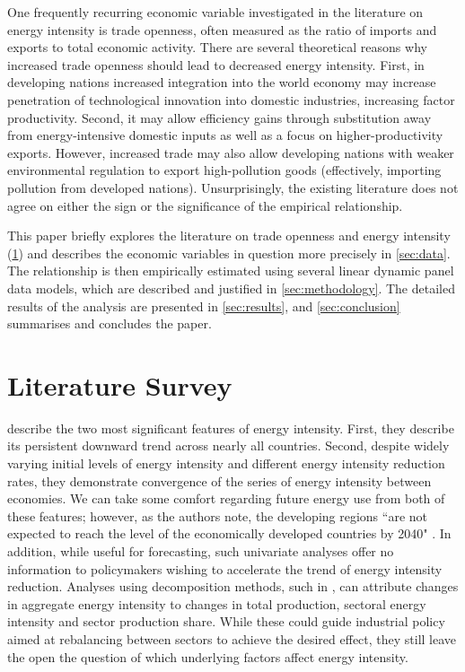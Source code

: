 \documentclass[12pt,a4paper]{article}
\begin{document}
One frequently recurring economic variable investigated in the literature on energy intensity is trade openness, often measured as the ratio of imports and exports to total economic activity.
There are several theoretical reasons why increased trade openness should lead to decreased energy intensity.
First, in developing nations increased integration into the world economy may increase penetration of technological innovation into domestic industries, increasing factor productivity.
Second, it may allow efficiency gains through substitution away from energy-intensive domestic
inputs as well as a focus on higher-productivity exports. 
However, increased trade may also allow developing nations with weaker environmental regulation to export high-pollution goods (effectively, importing pollution from developed nations). 
Unsurprisingly, the existing literature does not agree on either the sign or the significance of the empirical relationship.

This paper briefly explores the literature on trade openness and energy intensity (\cref{sec:literature}) and describes the economic variables in question more precisely in \cref{sec:data}.
The relationship is then empirically estimated using several linear dynamic panel data models, which are described and justified in \cref{sec:methodology}.
The detailed results of the analysis are presented in \cref{sec:results}, and \cref{sec:conclusion} summarises and concludes the paper.

\section{Literature Survey}\label{sec:literature}

\cite{ederAnalysisEnergyIntensity2018} describe the two most significant features of energy intensity. First, they describe its persistent downward trend across nearly all countries.
Second, despite widely varying initial levels of energy intensity and different energy intensity reduction rates, they demonstrate convergence of the series of energy intensity between economies.
We can take some comfort regarding future energy use from both of these features; however, as the authors note, the developing regions ``are not expected to reach the level of the economically developed countries by 2040" \citep[p.1971]{ederAnalysisEnergyIntensity2018}.
In addition, while useful for forecasting, such univariate analyses offer no information to policymakers wishing to accelerate the trend of energy intensity reduction. 
Analyses using decomposition methods, such in \cite{liuEightMethodsDecomposing2003}, can attribute changes in aggregate energy intensity to changes in total production, sectoral energy intensity and sector production share. While these could guide industrial policy aimed at rebalancing between sectors to achieve the desired effect, they still leave the open the question of which underlying factors affect energy intensity.
\end{document}
